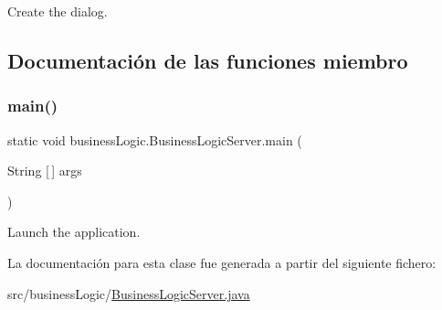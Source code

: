 Create the dialog. 

\subsection{Documentación de las funciones miembro}
\mbox{\label{classbusiness_logic_1_1_business_logic_server_a978c1596ce77baed488f137fc96a4fe8}} 
\subsubsection{\texorpdfstring{main()}{main()}}
{\footnotesize\ttfamily static void business\+Logic.\+Business\+Logic\+Server.\+main (\begin{DoxyParamCaption}\item[{String \mbox{[}$\,$\mbox{]}}]{args }\end{DoxyParamCaption})\hspace{0.3cm}{\ttfamily [static]}}

Launch the application. 

La documentación para esta clase fue generada a partir del siguiente fichero\+:\begin{DoxyCompactItemize}
\item 
src/business\+Logic/\mbox{\hyperlink{_business_logic_server_8java}{Business\+Logic\+Server.\+java}}\end{DoxyCompactItemize}

